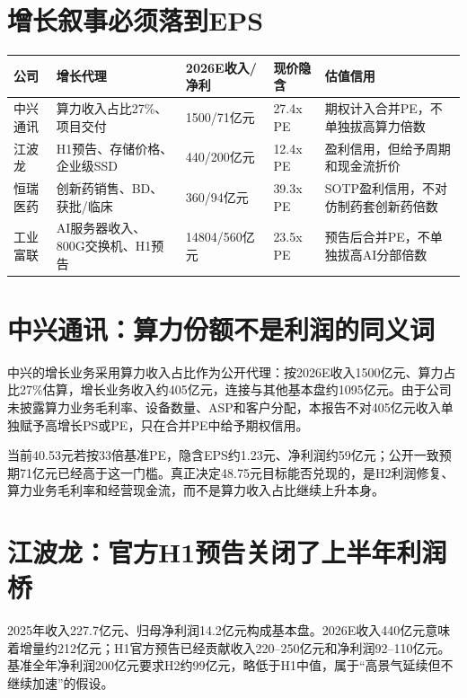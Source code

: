 \section{增长叙事必须落到EPS}

\begin{exhibitbox}
\begin{tabularx}{\textwidth}{L{2.2cm}L{3.0cm}L{2.6cm}L{2.4cm}X}
\toprule
\textbf{公司} & \textbf{增长代理} & \textbf{2026E收入/净利} & \textbf{现价隐含} & \textbf{估值信用} \\
\midrule
中兴通讯 & 算力收入占比27\%、项目交付 & 1500/71亿元 & 27.4x PE & 期权计入合并PE，不单独拔高算力倍数 \\
江波龙 & H1预告、存储价格、企业级SSD & 440/200亿元 & 12.4x PE & 盈利信用，但给予周期和现金流折价 \\
恒瑞医药 & 创新药销售、BD、获批/临床 & 360/94亿元 & 39.3x PE & SOTP盈利信用，不对仿制药套创新药倍数 \\
工业富联 & AI服务器收入、800G交换机、H1预告 & 14804/560亿元 & 23.5x PE & 预告后合并PE，不单独拔高AI分部倍数 \\
\bottomrule
\end{tabularx}
\end{exhibitbox}

\section{中兴通讯：算力份额不是利润的同义词}

中兴的增长业务采用算力收入占比作为公开代理：按2026E收入1500亿元、算力占比27\%估算，增长业务收入约405亿元，连接与其他基本盘约1095亿元。由于公司未披露算力业务毛利率、设备数量、ASP和客户分配，本报告不对405亿元收入单独赋予高增长PS或PE，只在合并PE中给予期权信用。

当前40.53元若按33倍基准PE，隐含EPS约1.23元、净利润约59亿元；公开一致预期71亿元已经高于这一门槛。真正决定48.75元目标能否兑现的，是H2利润修复、算力业务毛利率和经营现金流，而不是算力收入占比继续上升本身。

\section{江波龙：官方H1预告关闭了上半年利润桥}

2025年收入227.7亿元、归母净利润14.2亿元构成基本盘。2026E收入440亿元意味着增量约212亿元；H1官方预告已经贡献收入220--250亿元和净利润92--110亿元。基准全年净利润200亿元要求H2约99亿元，略低于H1中值，属于“高景气延续但不继续加速”的假设。

